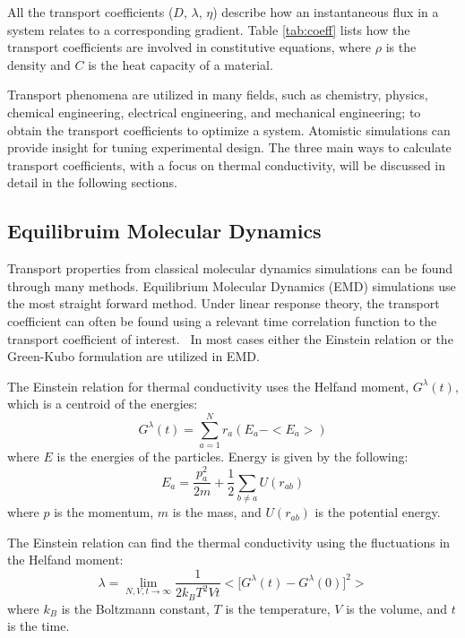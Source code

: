 All the transport coefficients ($D$, $\lambda$, $\eta$) describe how an instantaneous flux in a system relates to a corresponding gradient. Table \ref{tab:coeff} lists how the transport coefficients are involved in constitutive equations, where $\rho$ is the density and $C$ is the heat capacity of a material.

Transport phenomena are utilized in many fields, such as chemistry, physics, chemical engineering, electrical engineering, and mechanical engineering; to obtain the transport coefficients to optimize a system. Atomistic simulations can provide insight for tuning experimental design. The three main ways to calculate transport coefficients, with a focus on thermal conductivity, will be discussed in detail in the following sections.

\subsection{Equilibruim Molecular Dynamics}
Transport properties from classical molecular dynamics simulations can be found through many methods. Equilibrium Molecular Dynamics (EMD) simulations use the most straight forward method. Under linear response theory, the transport coefficient can often be found using a relevant time correlation function to the transport coefficient of interest.~\cite{Heyes:1988ee,MASSOBRIO:1984bl,Helfand:1960os,Viscardy:2007rp,che:6888,kinaci:014106} In most cases either the Einstein relation or the Green-Kubo formulation are utilized in EMD.

The Einstein relation for thermal conductivity uses the Helfand moment, $G^\lambda (t)$, which is a centroid of the energies:
\begin{equation}
    G^\lambda (t) = \sum^{N}_{a=1} r_a (E_a - <E_a>)
\end{equation}
where $E$ is the energies of the particles. Energy is given by the following: 
\begin{equation}
    E_a = \frac{p_a^2}{2m} + \frac{1}{2}\sum_{b\neq a} U(r_{ab})
\end{equation}
where $p$ is the momentum, $m$ is the mass, and $U(r_{ab})$ is the potential energy.

The Einstein relation can  find the thermal conductivity using the fluctuations in the Helfand moment:
\begin{equation}
    \lambda = \lim_{N,V,t \rightarrow \infty} \frac{1}{2k_B T^2 Vt} \bigg< \Big[ G^\lambda (t) - G^\lambda (0) \Big]^2\bigg>
\end{equation}
where $k_B$ is the Boltzmann constant, $T$ is the temperature, $V$ is the volume, and $t$ is the time.

